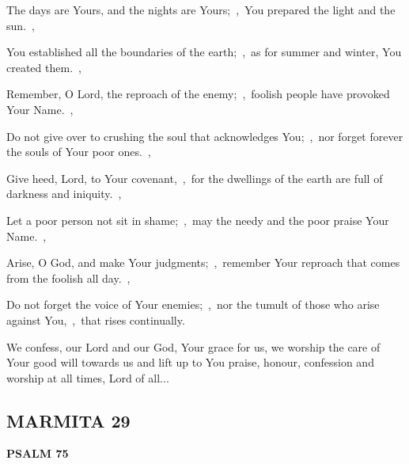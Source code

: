 \documentclass[12pt,twoside,a5paper]{article}
\newcommand{\marmita}[1]{\subsection*{MARMITA {#1}}}
\newcommand{\psalm}[1]{\textbf{PSALM {#1}}\nopagebreak}
\newcommand{\slota}[1]{\liturgicalhint{Slota.} #1}
\begin{document}
\begin{normalparskip}
  The days are Yours, and the nights are Yours;~\sep\ You prepared the light and the sun.~\sep

  You established all the boundaries of the earth;~\sep\ as for summer and winter, You created them.~\sep

  Remember, O Lord, the reproach of the enemy;~\sep\ foolish people have provoked Your Name.~\sep

  Do not give over to crushing the soul that acknowledges You;~\sep\ nor forget forever the souls of Your poor ones.~\sep

  Give heed, Lord, to Your covenant,~\sep\ for the dwellings of the earth are full of darkness and iniquity.~\sep

  Let a poor person not sit in shame;~\sep\ may the needy and the poor praise Your Name.~\sep

  Arise, O God, and make Your judgments;~\sep\ remember Your reproach that comes from the foolish all day.~\sep

  Do not forget the voice of Your enemies;~\sep\ nor the tumult of those who arise against You,~\sep\ that rises continually.
\end{normalparskip}

\slota{We confess, our Lord and our God, Your grace for us, we worship the care of Your good will towards us and lift up to You praise, honour, confession and worship at all times, Lord of all...}

\marmita{29}

\psalm{75}
\end{document}
